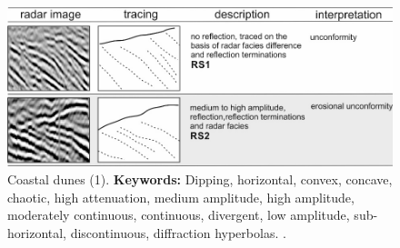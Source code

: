 \begin{figure}[h!]
    \centering
    \includegraphics[width=0.9\linewidth]{Figures/0.2GPR/Ribolini2021_dunes_1.png}
    \caption[Coastal dunes (1).]{Coastal dunes (1). \textbf{Keywords: } Dipping, horizontal, convex, concave, chaotic, high attenuation, medium amplitude, high amplitude, moderately continuous, continuous, divergent, low amplitude, sub-horizontal, discontinuous, diffraction hyperbolas. \citep{Ribolini2021}.}
    \label{fig:Ribolini2021-1}
\end{figure}


